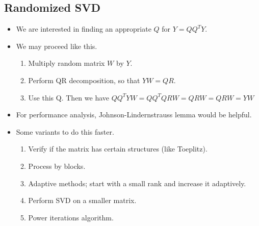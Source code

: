 \documentclass[11pt,reqno]{amsart}
\theoremstyle{remark}
\begin{document}
\subsection*{Randomized SVD}
\begin{itemize}
  \item We are interested in finding an appropriate $Q$ for $Y=QQ^T Y$.
  \item We may proceed like this.
  \begin{enumerate}
  \item Multiply random matrix $W$ by $Y$.
  \item Perform QR decomposition, so that $YW=QR$.
  \item Use this Q. Then we have $QQ^TYW=QQ^TQRW=QRW=QRW=YW$
  \end{enumerate}
  \item For performance analysis, Johnson-Lindernstrauss lemma would be helpful.
  \item Some variants to do this faster.
  \begin{enumerate}
  \item Verify if the matrix has certain structures (like Toeplitz).
  \item Process by blocks.
  \item Adaptive methods; start with a small rank and increase it adaptively.
  \item Perform SVD on a smaller matrix.
  \item Power iterations algorithm.
  \end{enumerate}
  \end{itemize}
  
\end{document}
